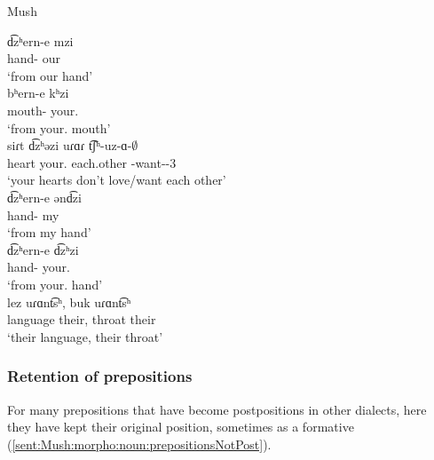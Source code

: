\begin{exe}
	\ex Mush \label{sent:Mush:morpho:noun:postnomPoss}
	\begin{xlist}
		\ex \gll d͡zʰern-e mzi \\
		hand-{\abl} our \\
		\trans `from our hand' \\
		\ex \gll bʰern-e kʰzi \\
		mouth-{\abl} your.{\sg} \\
		\trans `from your.{\sg} mouth' \\
		\ex \gll siɾt d͡zʰəzi uɾɑɾ t͡ʃʰ-uz-ɑ-$\emptyset$ \\
		heart your.{\pl} each.other {\neggloss}-want-{\thgloss}-3{\sg} \\
		\trans `your hearts don't love/want each other' \\
		\ex \gll d͡zʰern-e ənd͡zi \\
		hand-{\abl} my \\
		\trans `from my hand' \\
		\ex \gll d͡zʰern-e d͡zʰzi \\
		hand-{\abl} your.{\pl} \\
		\trans `from your.{\pl} hand' \\
		\ex \gll lez uɾɑnt͡sʰ, buk uɾɑnt͡sʰ \\
		language their, throat their \\ 
		\trans `their language, their throat' \\
		
	\end{xlist}
\end{exe}

\begin{adjarianpage}\label{page:119}\end{adjarianpage}%


\subsubsection{Retention of prepositions} 

For many prepositions that have become postpositions in other dialects, here they have kept their original position, sometimes as a formative (\ref{sent:Mush:morpho:noun:prepositionsNotPost}). 

